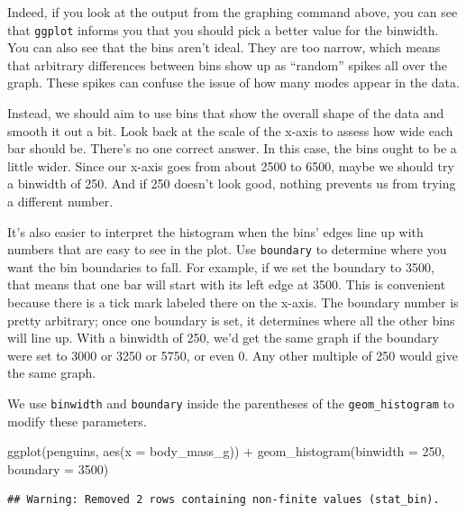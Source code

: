 \documentclass[
]{book}
\newenvironment{Shaded}{\begin{snugshade}}{\end{snugshade}}
\newcommand{\AttributeTok}[1]{\textcolor[rgb]{0.77,0.63,0.00}{#1}}
\newcommand{\DecValTok}[1]{\textcolor[rgb]{0.00,0.00,0.81}{#1}}
\newcommand{\FunctionTok}[1]{\textcolor[rgb]{0.00,0.00,0.00}{#1}}
\newcommand{\NormalTok}[1]{#1}
\newcommand{\SpecialCharTok}[1]{\textcolor[rgb]{0.00,0.00,0.00}{#1}}
\begin{document}
Indeed, if you look at the output from the graphing command above, you can see that \texttt{ggplot} informs you that you should pick a better value for the binwidth. You can also see that the bins aren't ideal. They are too narrow, which means that arbitrary differences between bins show up as ``random'' spikes all over the graph. These spikes can confuse the issue of how many modes appear in the data.

Instead, we should aim to use bins that show the overall shape of the data and smooth it out a bit. Look back at the scale of the x-axis to assess how wide each bar should be. There's no one correct answer. In this case, the bins ought to be a little wider. Since our x-axis goes from about 2500 to 6500, maybe we should try a binwidth of 250. And if 250 doesn't look good, nothing prevents us from trying a different number.

It's also easier to interpret the histogram when the bins' edges line up with numbers that are easy to see in the plot. Use \texttt{boundary} to determine where you want the bin boundaries to fall. For example, if we set the boundary to 3500, that means that one bar will start with its left edge at 3500. This is convenient because there is a tick mark labeled there on the x-axis. The boundary number is pretty arbitrary; once one boundary is set, it determines where all the other bins will line up. With a binwidth of 250, we'd get the same graph if the boundary were set to 3000 or 3250 or 5750, or even 0. Any other multiple of 250 would give the same graph.

We use \texttt{binwidth} and \texttt{boundary} inside the parentheses of the \texttt{geom\_histogram} to modify these parameters.

\begin{Shaded}
\begin{Highlighting}[]
\FunctionTok{ggplot}\NormalTok{(penguins, }\FunctionTok{aes}\NormalTok{(}\AttributeTok{x =}\NormalTok{ body\_mass\_g)) }\SpecialCharTok{+}
    \FunctionTok{geom\_histogram}\NormalTok{(}\AttributeTok{binwidth =} \DecValTok{250}\NormalTok{, }\AttributeTok{boundary =} \DecValTok{3500}\NormalTok{)}
\end{Highlighting}
\end{Shaded}

\begin{verbatim}
## Warning: Removed 2 rows containing non-finite values (stat_bin).
\end{verbatim}
\end{document}
